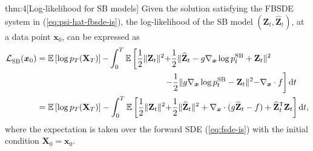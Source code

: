 \documentclass{article}
\def\eqref#1{(\ref{#1})}
\def\rvX{{\mathbf{X}}}
\def\rvZ{{\mathbf{Z}}}
\def\vx{{\bm{x}}}
\newcommand{\E}{\mathbb{E}}
\newcommand{\norm}[1]{\lVert#1\rVert}
\def\dt{{ \mathrm{d} t }}
\newcommand{\br}[1]{\left[#1\right]}
\newcommand{\T}{\mathsf{T}}
\begin{document}
\begin{reptheorem}{thm:4}[Log-likelihood for SB models]
    Given the solution satisfying the FBSDE system in \eqref{eq:psi-hat-fbsde-is},
    the log-likelihood of the SB model $(\rvZ_t, \widehat{\rvZ}_t)$, at a data point $\vx_0$, can be expressed as
  \begin{align}
      \LSB(\vx_0) &= \E\br{\log p_T(\rvX_T)} {-} \int_0^T \E\left[ \frac{1}{2} \norm{\rvZ_t}^2 {+} \frac{1}{2} \norm{\widehat{\rvZ}_t - g\nabla_\vx \log \pp{t}{SB} + \rvZ_t}^2 \right. \nonumber \\
      & \qquad \qquad \qquad \qquad \qquad \quad \qquad \qquad \left.  {-} \frac{1}{2} \norm{g\nabla_\vx \log \pp{t}{SB} - \rvZ_t}^2 {-} \nabla_\vx \cdot f \right] \dt \label{eq:app-sb-nll-bad} \\
      &= \E\br{\log p_T(\rvX_T)} - \int_0^T \E\br{ \frac{1}{2} \norm{\rvZ_t}^2 {+} \frac{1}{2} \norm{\widehat{\rvZ}_t}^2  + \nabla_\vx \cdot (g\widehat{\rvZ}_t -f) + \widehat{\rvZ}_t^\T{\rvZ}_t } \dt, \label{eq:app-sb-nll}
  \end{align}
  where the expectation is taken over the forward SDE \eqref{eq:fsde-is} with the initial condition $\rvX_0 = \vx_0$.
\end{reptheorem}
\end{document}
